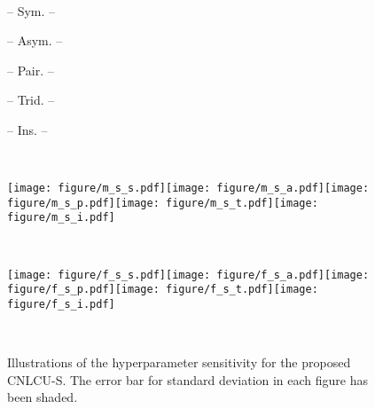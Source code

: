\documentclass[11pt]{article}
\begin{document}
\begin{figure*}[!h]
    \centering
    \begin{minipage}[c]{0.05\columnwidth}~\end{minipage}\begin{minipage}[c]{0.187\textwidth}\centering\small -- \scriptsize{Sym.} -- \end{minipage}\begin{minipage}[c]{0.187\textwidth}\centering\small -- \scriptsize{Asym.} -- \end{minipage}\begin{minipage}[c]{0.187\textwidth}\centering\small -- \scriptsize{Pair.} -- \end{minipage}
    \begin{minipage}[c]{0.187\textwidth}\centering\small -- \scriptsize{Trid.} -- \end{minipage}
    \begin{minipage}[c]{0.187\textwidth}\centering\small -- \scriptsize{Ins.} -- \end{minipage}\\
    \begin{minipage}[c]{0.05\columnwidth}\centering\small {} \end{minipage}\begin{minipage}[c]{0.95\textwidth}
        \texttt{[image: figure/m\_s\_s.pdf]}\texttt{[image: figure/m\_s\_a.pdf]}\texttt{[image: figure/m\_s\_p.pdf]}\texttt{[image: figure/m\_s\_t.pdf]}\texttt{[image: figure/m\_s\_i.pdf]}\end{minipage}\\
    \vspace{5pt}
    \begin{minipage}[c]{0.05\columnwidth}\centering\small {} \end{minipage}\begin{minipage}[c]{0.95\textwidth}
        \texttt{[image: figure/f\_s\_s.pdf]}\texttt{[image: figure/f\_s\_a.pdf]}\texttt{[image: figure/f\_s\_p.pdf]}\texttt{[image: figure/f\_s\_t.pdf]}\texttt{[image: figure/f\_s\_i.pdf]}\end{minipage}\\
    \caption{Illustrations of the hyperparameter sensitivity for the proposed CNLCU-S. The error bar for standard deviation in each figure has been shaded.}
    \label{fig:ablation_s}
\end{figure*}
\end{document}
